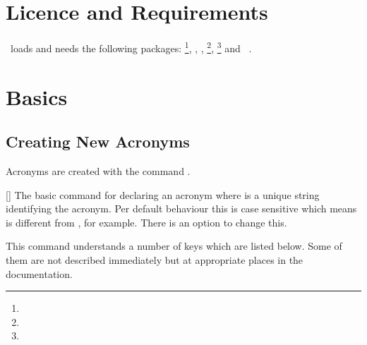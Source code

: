 \documentclass{acro-manual}
\begin{document}
\section{Licence and Requirements}
\license

\acro\ loads and needs the following packages:
\footnote{}, , ,
\footnote{},
\footnote{} and
~\cite{pkg:translations}.

\section{Basics}
\subsection{Creating New Acronyms}
Acronyms are created with the command .
\begin{commands}
  []
    The basic command for declaring an acronym where  is a unique
    string identifying the acronym.  Per default behaviour this is case
    sensitive which means  is different from , for example.
    There is an option  to change
    this.
\end{commands}
This command understands a number of keys which are listed below.  Some of
them are not described immediately but at appropriate places in the
documentation.
\end{document}
